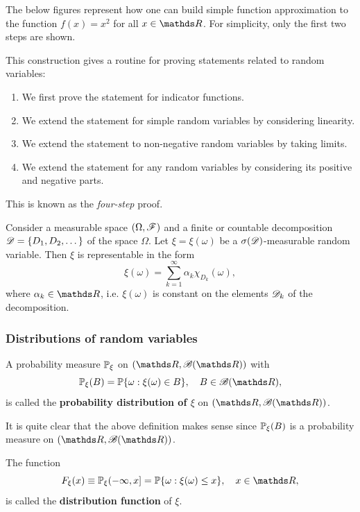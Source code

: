 The below figures represent how one can build simple function approximation to the function $f(x) = x^2$ for all $x \in \R$. For simplicity, only the first two steps are shown.


This construction gives a routine for proving statements related to random variables: 
\begin{enumerate}
    \item We first prove the statement for indicator functions.
    \item We extend the statement for simple random variables by considering linearity.
    \item We extend the statement to non-negative random variables by taking limits.
    \item We extend the statement for any random variables by considering its positive and negative parts.
\end{enumerate}
This is known as the \textit{four-step} proof.
\begin{lemma}
Consider a measurable space $(\Omega, \mathcal{F})$ and a finite or countable decomposition $\mathcal{D} = \{ D_1, D_2, \dots \}$ of the space $\Omega$. Let $\xi = \xi(\omega)$ be a $\sigma(\mathcal{D})$-measurable random variable. Then $\xi$ is representable in the form
\begin{equation*}
    \xi(\omega) = \sum_{k=1}^\infty \alpha_k \chi_{D_k}(\omega), 
\end{equation*}
where $\alpha_k \in \R$, i.e. $\xi(\omega)$ is constant on the elements $\mathcal{D}_k$ of the decomposition.
\end{lemma}
\subsubsection{Distributions of random variables}

\begin{definition}
A probability measure $\mathbb{P}_\xi$ on $(\R, \B(\R))$ with 
\begin{equation*}
    \p_\xi(B) = \p \{ \omega: \xi(\omega) \in B \}, \quad B \in \B(\R),
\end{equation*}
is called the \textbf{probability distribution of $\xi$} on $(\R, \B(\R))$.
\end{definition}

It is quite clear that the above definition makes sense since $\mathbb{P}_\xi(B)$ is a probability measure on $(\R, \B(\R))$.

\begin{definition}
The function
\begin{equation*}
    F_\xi (x) \equiv \p_\xi(-\infty,x]= \p \{ \omega: \xi(\omega) \le x \}, \quad x\in \R,
\end{equation*}
is called the \textbf{distribution function} of $\xi$.
\end{definition}

